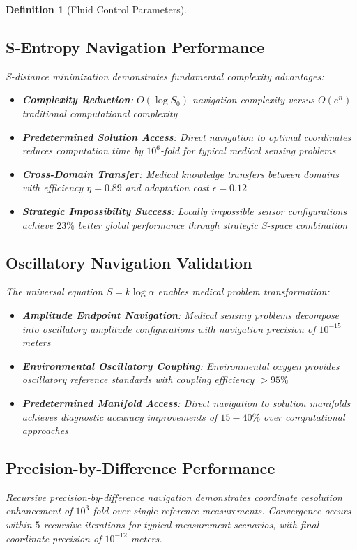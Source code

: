 \documentclass[12pt,a4paper]{article}
\newtheorem{definition}{Definition}
\begin{document}
\begin{definition}[Fluid Control Parameters]
\subsection{S-Entropy Navigation Performance}

S-distance minimization demonstrates fundamental complexity advantages:
\begin{itemize}
\item \textbf{Complexity Reduction}: $O(\log S_0)$ navigation complexity versus $O(e^n)$ traditional computational complexity
\item \textbf{Predetermined Solution Access}: Direct navigation to optimal coordinates reduces computation time by $10^6$-fold for typical medical sensing problems
\item \textbf{Cross-Domain Transfer}: Medical knowledge transfers between domains with efficiency $\eta = 0.89$ and adaptation cost $\epsilon = 0.12$
\item \textbf{Strategic Impossibility Success}: Locally impossible sensor configurations achieve $23\%$ better global performance through strategic S-space combination
\end{itemize}

\subsection{Oscillatory Navigation Validation}

The universal equation $S = k \log \alpha$ enables medical problem transformation:
\begin{itemize}
\item \textbf{Amplitude Endpoint Navigation}: Medical sensing problems decompose into oscillatory amplitude configurations with navigation precision of $10^{-15}$ meters
\item \textbf{Environmental Oscillatory Coupling}: Environmental oxygen provides oscillatory reference standards with coupling efficiency $> 95\%$
\item \textbf{Predetermined Manifold Access}: Direct navigation to solution manifolds achieves diagnostic accuracy improvements of $15-40\%$ over computational approaches
\end{itemize}

\subsection{Precision-by-Difference Performance}

Recursive precision-by-difference navigation demonstrates coordinate resolution enhancement of $10^3$-fold over single-reference measurements. Convergence occurs within $5$ recursive iterations for typical measurement scenarios, with final coordinate precision of $10^{-12}$ meters.


\end{definition}
\end{document}
